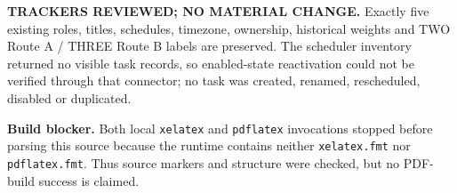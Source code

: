 \documentclass[11pt]{article}
\begin{document}
\noindent\textbf{TRACKERS REVIEWED; NO MATERIAL CHANGE.}  Exactly five existing roles, titles, schedules, timezone, ownership, historical weights and TWO Route A / THREE Route B labels are preserved.  The scheduler inventory returned no visible task records, so enabled-state reactivation could not be verified through that connector; no task was created, renamed, rescheduled, disabled or duplicated.

\noindent\textbf{Build blocker.}  Both local \texttt{xelatex} and \texttt{pdflatex} invocations stopped before parsing this source because the runtime contains neither \texttt{xelatex.fmt} nor \texttt{pdflatex.fmt}.  Thus source markers and structure were checked, but no PDF-build success is claimed.
\end{document}
